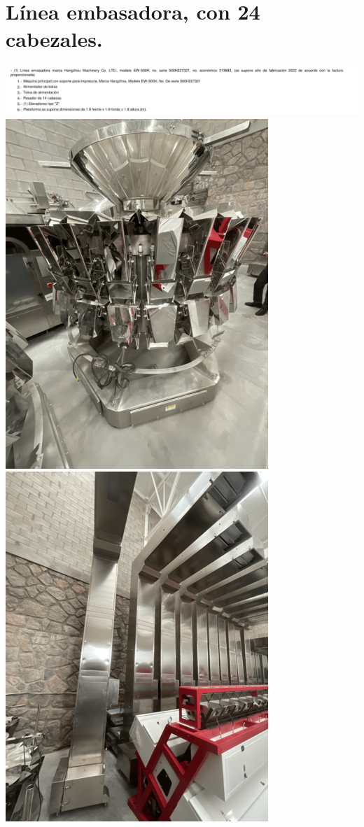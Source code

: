 \documentclass{article}
\begin{document}
\section{Línea embasadora, con 24 cabezales.} %
\includegraphics[width=  \linewidth]{images/decript/13.png}
\includegraphics[width=  .5\linewidth]{images/foto/13.png}
\includegraphics[width=  .5\linewidth]{images/foto/13.1.png}

\end{document}
